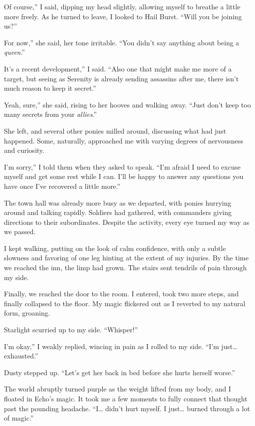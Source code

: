 \leavevmode{}Of course,” I said, dipping my head slightly, allowing myself to breathe a little more freely. As he turned to leave, I looked to Hail Burst. “Will you be joining us?”

\leavevmode{}For now,” she said, her tone irritable. “You didn’t say anything about being a \textit{queen}.”

\leavevmode{}It’s a recent development,” I said. “Also one that might make me more of a target, but seeing as Serenity is already sending assassins after me, there isn’t much reason to keep it secret.”

\leavevmode{}Yeah, sure,” she said, rising to her hooves and walking away. “Just don’t keep too many secrets from your \textit{allies}.”

She left, and several other ponies milled around, discussing what had just happened. Some, naturally, approached me with varying degrees of nervousness and curiosity.

\leavevmode{}I’m sorry,” I told them when they asked to speak. “I’m afraid I need to excuse myself and get some rest while I can. I’ll be happy to answer any questions you have once I’ve recovered a little more.”

The town hall was already more busy as we departed, with ponies hurrying around and talking rapidly. Soldiers had gathered, with commanders giving directions to their subordinates. Despite the activity, every eye turned my way as we passed.

I kept walking, putting on the look of calm confidence, with only a subtle slowness and favoring of one leg hinting at the extent of my injuries. By the time we reached the inn, the limp had grown. The stairs sent tendrils of pain through my side.

Finally, we reached the door to the room. I entered, took two more steps, and finally collapsed to the floor. My magic flickered out as I reverted to my natural form, groaning.

Starlight scurried up to my side. “Whisper!”

\leavevmode{}I’m okay,” I weakly replied, wincing in pain as I rolled to my side. “I’m just… exhausted.”

Dusty stepped up. “Let’s get her back in bed before she hurts herself worse.”

The world abruptly turned purple as the weight lifted from my body, and I floated in Echo’s magic. It took me a few moments to fully connect that thought past the pounding headache. “I… didn’t hurt myself. I just… burned through a lot of magic.”

